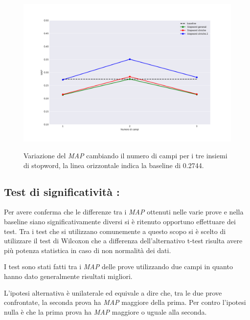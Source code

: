 \documentclass[runningheads]{llncs}
\begin{document}
\begin{figure}%
    \centering
    {{\includegraphics[width=0.8\linewidth]{maps} }}%
    \caption{Variazione del \textit{MAP} cambiando il numero di campi per i tre insiemi di stopword, la linea orizzontale indica la baseline di 0.2744.}%
    \vspace{-10mm}
\end{figure}


\subsection{Test di significativit\`a :}
Per avere conferma che le differenze tra i \textit{MAP} ottenuti nelle varie prove e nella baseline
siano significativamente diversi si \`e ritenuto opportuno effettuare dei test.
Tra i test che si utilizzano comunemente a questo scopo si \`e scelto di utilizzare il
test di Wilcoxon che a differenza dell'alternativo t-test risulta avere pi\`u
potenza statistica in caso di non normalit\`a dei dati.

I test sono stati fatti tra i \textit{MAP} delle prove utilizzando due campi in quanto hanno
dato generalmente risultati migliori.

L'ipotesi alternativa \`e unilaterale ed equivale a dire che, tra le due prove
confrontate, la seconda prova ha \textit{MAP} maggiore della prima.
Per contro l'ipotesi nulla \`e che la prima prova ha \textit{MAP} maggiore o uguale alla seconda.
\end{document}
